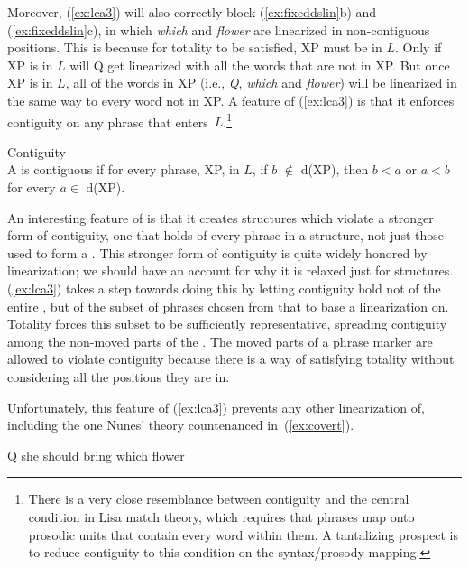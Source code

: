 \documentclass[output=paper]{langsci/langscibook}
\begin{document}
Moreover, (\ref{ex:lca3}) will also correctly block (\ref{ex:fixeddslin}b) and
(\ref{ex:fixeddslin}c), in which \emph{which} and \emph{flower} are linearized
in non-contiguous positions. This is because for totality to be satisfied, XP
must be in $L$. Only if XP is in $L$ will Q get linearized with all the words
that are not in XP. But once XP is in $L$, all of the words in XP (i.e.,
\emph{Q}, \emph{which} and \emph{flower}) will be linearized in the same way to
every word not in XP. A feature of (\ref{ex:lca3}) is that it enforces
contiguity on any phrase that enters~$L$.\footnote{There is a very close
resemblance between contiguity and the central condition in Lisa 
match theory, which requires that phrases map onto
prosodic units that contain every word within them. A tantalizing prospect is
to reduce contiguity to this condition on the syntax/prosody mapping.} %
\begin{exe}
	\ex \label{ex:contiguity} Contiguity\\
	A  is contiguous if for every phrase, XP, in $L$, if $b$ $\notin$ d(XP), then $b<a$ or $a<b$ for every $a \in$ d(XP).
\end{exe}

An interesting feature of  is that it creates structures which violate
a stronger form of contiguity, one that holds of every phrase in a structure,
not just those used to form a . This stronger form of contiguity
is quite widely honored by linearization; we should have an account for why it
is relaxed just for  structures. (\ref{ex:lca3}) takes a step towards
doing this by letting contiguity hold not of the entire , but of
the subset of phrases chosen from that  to base a linearization
on. Totality forces this subset to be sufficiently representative, spreading
contiguity among the non-moved parts of the . The moved parts of a
phrase marker are allowed to violate contiguity because there is a way of
satisfying totality without considering all the positions they are in.

Unfortunately, this feature of (\ref{ex:lca3}) prevents any other linearization
of\linebreak{}, including the one Nunes' theory countenanced
in~(\ref{ex:covert}).

\begin{exe}
	\ex \label{ex:covert} Q she should bring which flower
\end{exe}
\end{document}
